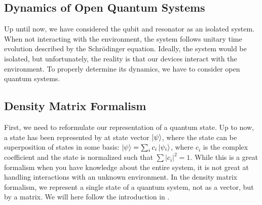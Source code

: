 \begin{fullwidth}
\chapter{Dynamics of Open Quantum Systems} \label{chap:open_quantum_systems}
\end{fullwidth}
Up until now, we have considered the qubit and resonator as an isolated system. When not interacting with the environment, the system follows unitary time evolution described by the Schrödinger equation. Ideally, the system would be isolated, but unfortunately, the reality is that our devices interact with the environment. To properly  determine its dynamics, we have to consider open quantum systems. \\


\section{Density Matrix Formalism}\label{sec:density_matrix_formalism}
First, we need to reformulate our representation of a quantum state. Up to now, a state has been represented by at state vector $\ket{\psi}$, where the state can be superposition of states in some basis: $\ket{\psi} = \sum_i c_i\ket{\psi_i}$, where $c_i$ is the complex coefficient and the state is normalized such that $\sum |c_i|^2 = 1$. While this is a great formalism when you have knowledge about the entire system, it is not great at handling interactions with an unknown environment. In the density matrix formalism, we represent a single state of a quantum system, not as a vector, but by a matrix. We will here follow the introduction in \cite{manzano_short_2020}.

